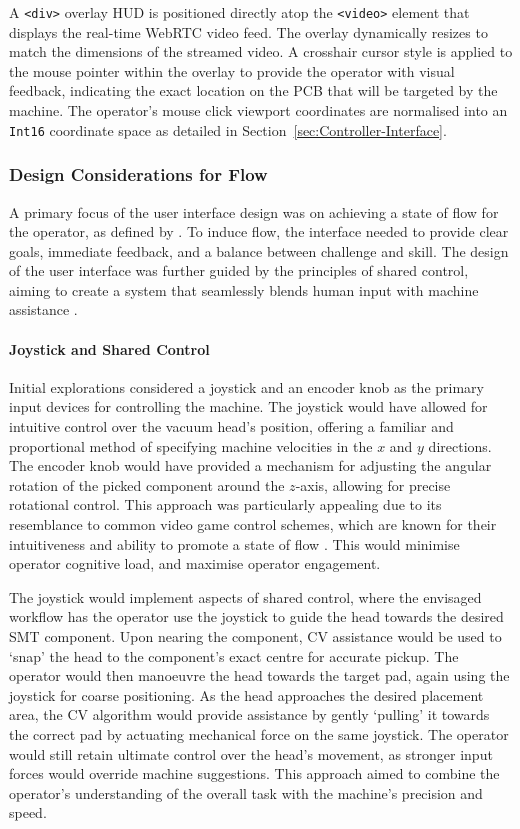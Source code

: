 \documentclass[12pt,british,UKenglish]{article}
\begin{document}
A \texttt{<div>} overlay \acs{HUD} is positioned directly atop the \texttt{<video>} element that displays the real-time \ac{WebRTC} video feed.
The overlay dynamically resizes to match the dimensions of the streamed video.
A crosshair cursor style is applied to the mouse pointer within the overlay to provide the operator with visual feedback, indicating the exact location on the \ac{PCB} that will be targeted by the machine.
The operator's mouse click viewport coordinates are normalised into an \texttt{Int16} coordinate space as detailed in Section~\ref{sec:Controller-Interface}.

\subsubsection{Design Considerations for Flow}

A primary focus of the user interface design was on achieving a state of flow for the operator, as defined by \cite{csikszentmihalyi2000beyond}.
To induce flow, the interface needed to provide clear goals, immediate feedback, and a balance between challenge and skill.
The design of the user interface was further guided by the principles of shared control, aiming to create a system that seamlessly blends human input with machine assistance \cite{Dragan2013}.

\paragraph{Joystick and Shared Control}
Initial explorations considered a joystick and an encoder knob as the primary input devices for controlling the machine.
The joystick would have allowed for intuitive control over the vacuum head's position, offering a familiar and proportional method of specifying machine velocities in the $x$ and $y$ directions.
The encoder knob would have provided a mechanism for adjusting the angular rotation of the picked component around the $z$-axis, allowing for precise rotational control.
This approach was particularly appealing due to its resemblance to common video game control schemes, which are known for their intuitiveness and ability to promote a state of flow \cite{doi:10.1177/1541931215591400}.
This would minimise operator cognitive load, and maximise operator engagement.

The joystick would implement aspects of shared control, where the envisaged workflow has the operator use the joystick to guide the head towards the desired \ac{SMT} component.
Upon nearing the component, \ac{CV} assistance would be used to `snap' the head to the component's exact centre for accurate pickup.
The operator would then manoeuvre the head towards the target pad, again using the joystick for coarse positioning.
As the head approaches the desired placement area, the \ac{CV} algorithm would provide assistance by gently `pulling' it towards the correct pad by actuating mechanical force on the same joystick.
The operator would still retain ultimate control over the head's movement, as stronger input forces would override machine suggestions.
This approach aimed to combine the operator's understanding of the overall task with the machine's precision and speed.
\end{document}
